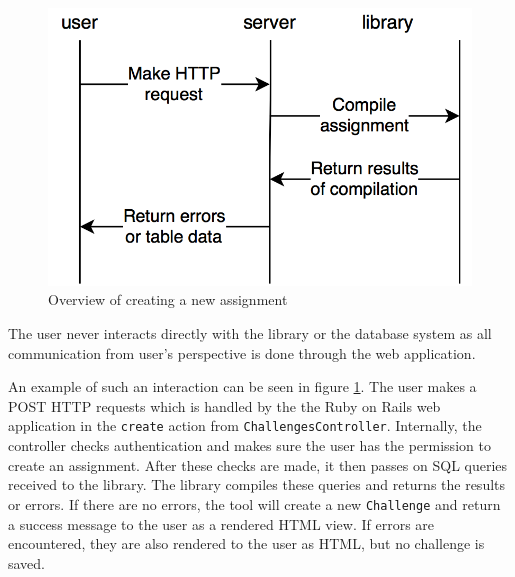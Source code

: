 \begin{figure}[H]
    \centering
    \includegraphics[width=(\linewidth / 2)]{Chapters/4-Design/create_assignment.png}
    \caption{Overview of creating a new assignment}
    \label{fig:create_assignment}
\end{figure}

The user never interacts directly with the library or the database system as all communication from user's perspective is done through the web application.

An example of such an interaction can be seen in figure \ref{fig:create_assignment}. The user makes a POST HTTP requests which is handled by the the Ruby on Rails web application in the \texttt{create} action from \texttt{ChallengesController}. Internally, the controller checks authentication and makes sure the user has the permission to create an assignment. After these checks are made, it then passes on SQL queries received to the library. The library compiles these queries and returns the results or errors. If there are no errors, the tool will create a new \texttt{Challenge} and return a success message to the user as a rendered HTML view. If errors are encountered, they are also rendered to the user as HTML, but no challenge is saved.